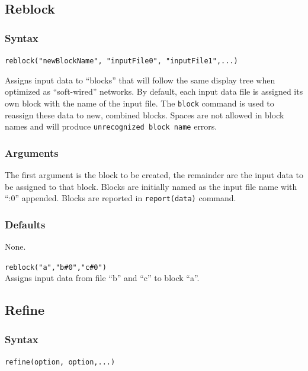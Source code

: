 \subsection{Reblock}
	\subsubsection{Syntax}
		\texttt{reblock("newBlockName", "inputFile0", "inputFile1",...)}
	
	\begin{phygdescription}
	{Assigns input data to ``blocks'' that will follow the same display tree when optimized
	as ``soft-wired'' networks. By default, each input data file is assigned its own block with 
	the name of the input file. The \texttt{block} command is used to reassign these data to 
	new, combined blocks. Spaces are not allowed in block names and will produce 
	\texttt{unrecognized block name} errors.} 
	\end{phygdescription}
	
	\subsubsection{Arguments}
		The first argument is the block to be created, the remainder are the input data to 
		be assigned to that block. Blocks are initially named as the input file name with 
		``:0'' appended. Blocks are reported in \texttt{report(data)} command.
	
	\subsubsection{Defaults}
		None.
	
	\begin{example}

		\item{\texttt{reblock("a","b\#0","c\#0")}\\ Assigns input data from file ``b'' and ``c'' 
		to block ``a''. }
	
	\end{example}

\subsection{Refine}
	\subsubsection{Syntax}
		\texttt{refine(option, option,...)}
		
